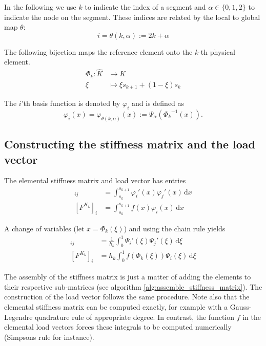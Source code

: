 In the following we use \( k \) to indicate the index
of a segment and \( \alpha \in \{  0, 1, 2  \} \) to indicate
the node on the segment. These indices are related by the
local to global map \( \theta \):
\begin{equation}
  \label{eq:loc2glob}
  i = \theta(k, \alpha) := 2k + \alpha    
\end{equation}

The following bijection maps the reference element onto
the \( k \)-th physical element.
\begin{align}
  \Phi_k : \hat{K} &\longrightarrow  K \\
  \xi & \longmapsto \xi s_{k+1} + (1-\xi) s_{k}
\end{align}

The \( i \)'th basis function is denoted by \( \varphi_i \)
and is defined as
\begin{equation}
  \varphi_i(x) = \varphi_{\theta(k, \alpha)} (x) := \Psi_{\alpha}({{\Phi_k}^{-1}(x) }).
\end{equation}

\subsection{Constructing the stiffness matrix and the load vector}

The elemental stiffness matrix and load vector has entries
\begin{align}
  [A^{K_k}]_{ij}
    &=  \int_{s_k}^{s_{k+1}} \varphi_i'(x) \varphi_j'(x) \,\mathrm{d}x\\
  [F^{K_k}]_i
    &= \int_{s_k}^{s_{k+1}} f\left(x\right) \varphi_i\left(x\right) \,\mathrm{d}x
\end{align}

A change of variables (let \( x = \Phi_k(\xi) \)) and using the chain rule yields
\begin{align}
  [A^{K_k}]_{ij}
    &= \frac{1}{h_k} \int_{0}^{1} \Psi_i'(\xi)\Psi_j'(\xi) \,\mathrm{d}\xi \\
  [F^{K_k}]_i
    &= h_k \int_{0}^{1} f\left(\Phi_k\left(\xi\right)\right) \Psi_i\left(\xi\right) \,\mathrm{d}\xi
\end{align}

The assembly of the stiffness matrix is just a matter of
adding the elements to their respective sub-matrices (see algorithm \ref{alg:assemble_stiffness_matrix}).
The construction of the load vector follows the same procedure.
Note also that the elemental stiffness matrix
can be computed exactly, for example with a Gauss-Legendre quadrature rule of appropriate
degree. In contrast, the function \( f \) in the elemental load vectors
forces these integrals to be computed numerically (Simpsons rule for instance).

